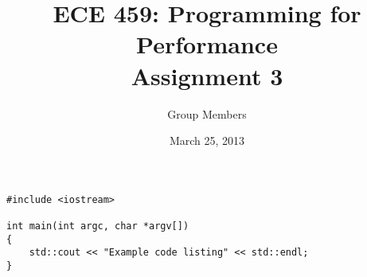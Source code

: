 \documentclass[12pt]{article}
\title{ECE 459: Programming for Performance\\Assignment 3}
\author{Group Members}
\date{March 25, 2013}
\begin{document}
\maketitle

\begin{lstlisting}
#include <iostream>

int main(int argc, char *argv[])
{
    std::cout << "Example code listing" << std::endl;
}
\end{lstlisting}
\end{document}
